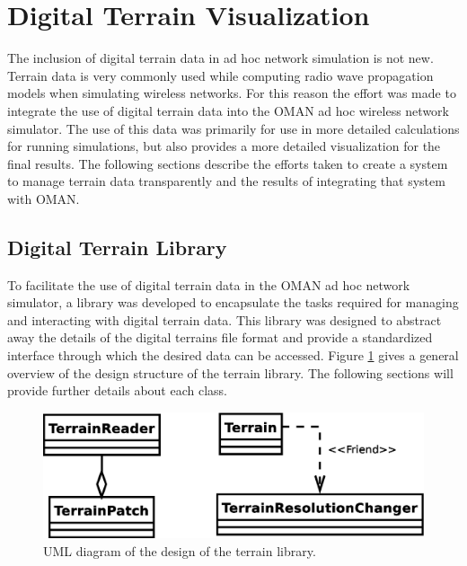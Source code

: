 \section{Digital Terrain Visualization}
The inclusion of digital terrain data in ad hoc network simulation is not new.  Terrain data is very commonly used while computing radio wave propagation models when simulating wireless networks.  For this reason the effort was made to integrate the use of digital terrain data into the OMAN ad hoc wireless network simulator.  The use of this data was primarily for use in more detailed calculations for running simulations, but also provides a more detailed visualization for the final results.  The following sections describe the efforts taken to create a system to manage terrain data transparently and the results of integrating that system with OMAN.

\subsection{Digital Terrain Library}
To facilitate the use of digital terrain data in the OMAN ad hoc network simulator, a library was developed to encapsulate the tasks required for managing and interacting with digital terrain data.  This library was designed to abstract away the details of the digital terrains file format and provide a standardized interface through which the desired data can be accessed.  Figure \ref{fig:terrain_lib_diagram} gives a general overview of the design structure of the terrain library.  The following sections will provide further details about each class.

\begin{figure}[ht]
\begin{center}
		\includegraphics[scale=0.45]{images/network_vis/terrain_lib_diagram.eps}
\end{center}
\caption{UML diagram of the design of the terrain library.}
\label{fig:terrain_lib_diagram}
\end{figure}

